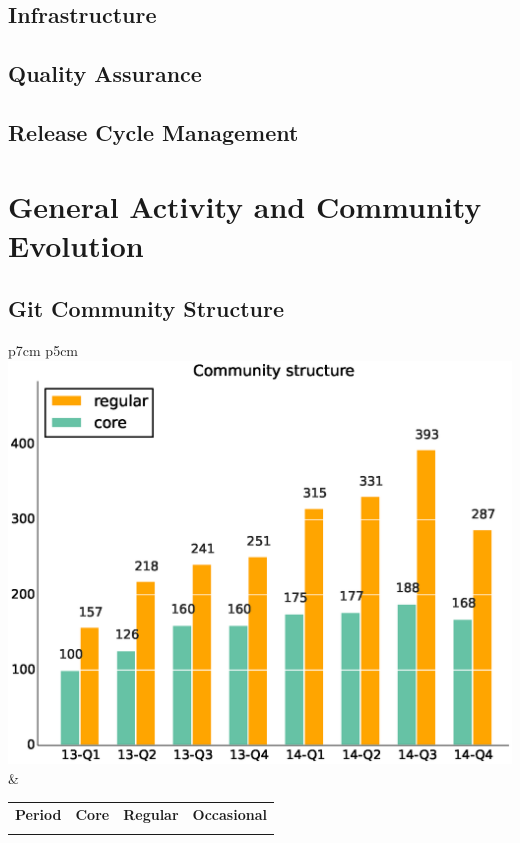 \documentclass[a4wide,11pt]{report}
\begin{document}
\newpage
\section{Infrastructure}


\newpage
\section{Quality Assurance}


\newpage
\section{Release Cycle Management}



\chapter{General Activity and Community Evolution}

\section{Git Community Structure}

\begin{tabular}{p{7cm} p{5cm}}
    \vspace{0pt} 
    \includegraphics[scale=.35]{figs/onion.eps}
    & 
    \vspace{0pt}
    \begin{tabular}{l|r|r|r|}%
    \bfseries Period & \bfseries Core & \bfseries Regular & \bfseries Occasional%
    \csvreader[head to column names]{data/onion_model.csv}{}%
    {\\ & \core & \regular & \occasional}
    \end{tabular}
\end{tabular}
\end{document}
